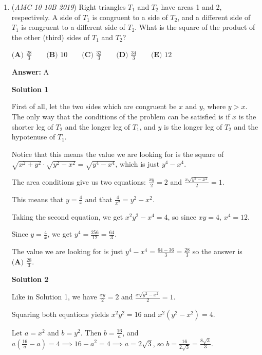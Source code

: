 \begin{enumerate}
 


	\item (\textit{AMC 10 10B 2019}) Right triangles $T_1$ and $T_2$ have areas 1 and 2, respectively. A side of $T_1$ is congruent to a side of $T_2$, and a different side of $T_1$ is congruent to a different side of $T_2$. What is the square of the product of the other (third) sides of $T_1$ and $T_2$?


 $\textbf{(A) } \frac{28}{3} \qquad\textbf{(B) }10\qquad\textbf{(C) } \frac{32}{3} \qquad\textbf{(D) } \frac{34}{3} \qquad\textbf{(E) }12$

 \textbf{Answer: }A



\textbf{Solution 1}

First of all, let the two sides which are congruent be $x$ and $y$, where $y > x$. The only way that the conditions of the problem can be satisfied is if $x$ is the shorter leg of $T_{2}$ and the longer leg of $T_{1}$, and $y$ is the longer leg of $T_{2}$ and the hypotenuse of $T_{1}$.

 Notice that this means the value we are looking for is the square of $\sqrt{x^{2}+y^{2}} \cdot \sqrt{y^{2}-x^{2}} = \sqrt{y^{4}-x^{4}}$, which is just $y^{4}-x^{4}$.

 The area conditions give us two equations: $\frac{xy}{2} = 2$ and $\frac{x\sqrt{y^{2}-x^{2}}}{2} = 1$.

 This means that $y = \frac{4}{x}$ and that $\frac{4}{x^{2}} = y^{2} - x^{2}$.

 Taking the second equation, we get $x^{2}y^{2} - x^{4} = 4$, so since $xy = 4$, $x^{4} = 12$.

 Since $y = \frac{4}{x}$, we get $y^{4} = \frac{256}{12} = \frac{64}{3}$.

 The value we are looking for is just $y^{4}-x^{4} = \frac{64-36}{3} = \frac{28}{3}$ so the answer is $\boxed{\textbf{(A) }\frac{28}{3}}$.

 



\textbf{Solution 2}

Like in Solution 1, we have $\frac{xy}{2} = 2$ and $\frac{x\sqrt{y^{2}-x^{2}}}{2} = 1$.

 Squaring both equations yields $x^2y^2=16$ and $x^2(y^2-x^2)=4$.

 Let $a = x^2$ and $b = y^2$. Then $b = \frac{16}{a}$, and $a\left(\frac{16}{a}-a\right)=4 \implies 16 - a^2 = 4 \implies a = 2\sqrt3$, so $b = \frac{16}{2\sqrt3} = \frac{8\sqrt3}{3}$.


\end{enumerate}
